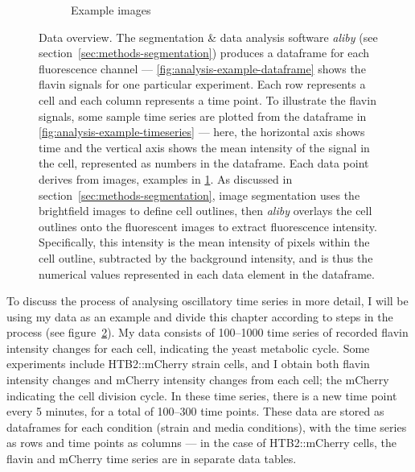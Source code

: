 \begin{figure}
\begin{subfigure}[htpb]{0.5\textwidth}
   \caption{
     Example images
   }
   \label{fig:analysis-example-images}
  \end{subfigure}
  \caption{
    Data overview.
    The segmentation \& data analysis software \textit{aliby} (see section~\ref{sec:methods-segmentation}) produces a dataframe for each fluorescence channel --- \ref{fig:analysis-example-dataframe} shows the flavin signals for one particular experiment.
    Each row represents a cell and each column represents a time point.
    To illustrate the flavin signals, some sample time series are plotted from the dataframe in \ref{fig:analysis-example-timeseries} --- here, the horizontal axis shows time and the vertical axis shows the mean intensity of the signal in the cell, represented as numbers in the dataframe.
    Each data point derives from images, examples in \ref{fig:analysis-example-images}.
    As discussed in section~\ref{sec:methods-segmentation},
    image segmentation uses the brightfield images to define cell outlines, then \textit{aliby} overlays the cell outlines onto the fluorescent images to extract fluorescence intensity.
    Specifically, this intensity is the mean intensity of pixels within the cell outline, subtracted by the background intensity, and is thus the numerical values represented in each data element in the dataframe.
  }
  \label{fig:analysis-data-overview}
\end{figure}

To discuss the process of analysing oscillatory time series in more detail, I will be using my data as an example and divide this chapter according to steps in the process (see figure~\ref{fig:analysis-data-overview}).
My data consists of 100--1000 time series of recorded flavin intensity changes for each cell, indicating the yeast metabolic cycle.
Some experiments include HTB2::mCherry strain cells, and I obtain both flavin intensity changes and mCherry intensity changes from each cell;
the mCherry indicating the cell division cycle.
In these time series, there is a new time point every 5 minutes, for a total of 100--300 time points.
These data are stored as dataframes for each condition (strain and media conditions), with the time series as rows and time points as columns ---
in the case of HTB2::mCherry cells, the flavin and mCherry time series are in separate data tables.


